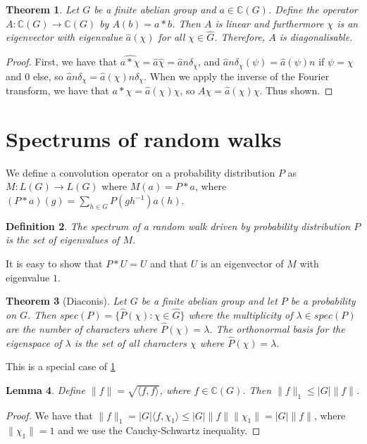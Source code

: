 \documentclass[]{article}
\newtheorem{theorem}{Theorem}
\newtheorem{lemma}[theorem]{Lemma}
\newtheorem{definition}[theorem]{Definition}
\theoremstyle{definition}
\numberwithin{theorem}{section}
\numberwithin{equation}{section}
\begin{document}
\begin{theorem}
	\label{thm:Eigenvector operators}
	Let $G$ be a finite abelian group and $a \in \mathbb{C}(G)$. Define the operator $A: \mathbb{C}(G) \rightarrow \mathbb{C}(G)$ by $A(b) = a \ast b$. Then $A$ is linear and furthermore $\chi$ is an eigenvector with eigenvalue $\widehat{a}(\chi)$ for all $\chi \in \widehat{G}$. Therefore, $A$ is diagonalisable. 
\end{theorem}

\begin{proof}
	First, we have that $\widehat{a\ast \chi} = \widehat{a} \widehat{\chi} = \widehat{a} n \delta_\chi$, and $\widehat{a} n \delta_\chi(\psi) = \widehat{a}(\psi) n$ if $\psi = \chi$ and 0 else, so $\widehat{a} n \delta_\chi = \widehat{a}(\chi) n \delta_\chi$. When we apply the inverse of the Fourier transform, we have that $a \ast \chi = \widehat{a}(\chi) \chi$, so $A \chi = \widehat{a}(\chi) \chi$. Thus shown. 
\end{proof}

\section{Spectrums of random walks}
We define a convolution operator on a probability distribution $P$ as $M : L(G) \rightarrow L(G)$ where $M(a) = P \ast a$, where $(P \ast a) (g) =\sum_{h\in G} P(gh^{-1})a(h)$.
\begin{definition}
	The spectrum of a random walk driven by probability distribution $P$ is the set of eigenvalues of $M$. 
\end{definition} 
It is easy to show that $P \ast U = U$ and that $U$ is an eigenvector of $M$ with eigenvalue $1$. 


\begin{theorem}[Diaconis]
	\label{thm:Diaconis}
	Let $G$ be a finite abelian group and let $P$ be a probability on $G$. Then $spec(P) = \lbrace \widehat{P}(\chi) : \chi \in \widehat{G} \rbrace$ where the multiplicity of $\lambda \in spec(P)$ are the number of characters where $\widehat{P}(\chi) = \lambda$. The orthonormal basis for the eigenspace of $\lambda$ is the set of all characters $\chi$ where $\widehat{P}(\chi) = \lambda$. 
\end{theorem}
This is a special case of \cref{thm:Eigenvector operators}

\begin{lemma}
	\label{lem:Absolute Value Inequality}
	Define $\|f\| = \sqrt{\langle f, f \rangle}$, where $f \in \mathbb{C}(G)$. Then $\|f \|_1 \leq |G| \|f \|$.
\end{lemma}
\begin{proof}
	We have that $\|f \|_1 = |G| \langle f, \chi_1 \rangle \leq |G| \|f \| \|\chi_1 \| = |G| \|f \|$, where $\|\chi_1 \| = 1$ and we use the Cauchy-Schwartz inequality. 
\end{proof}
\end{document}
